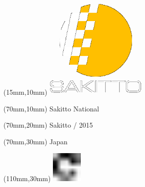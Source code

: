 \null\newpage
\begin{textblock*}{50mm}(15mm,10mm)%
\includegraphics[width=50mm]{LG/SAK.png}
\end{textblock*}
\begin{textblock*}{130mm}(70mm,10mm)%
{\fontsize{20}{20}\selectfont Sakitto National}\\
\end{textblock*}
\begin{textblock*}{120mm}(70mm,20mm)%
{\fontsize{16}{16}\selectfont Sakitto / 2015}\\
\end{textblock*}
\begin{textblock*}{120mm}(70mm,30mm)%
{\fontsize{12}{12}\selectfont Japan}
\end{textblock*}
\begin{textblock*}{30mm}(110mm,30mm)%
\centering
\includegraphics[height=15mm]{icons/fa-rotate-right.pdf}
\end{textblock*}
